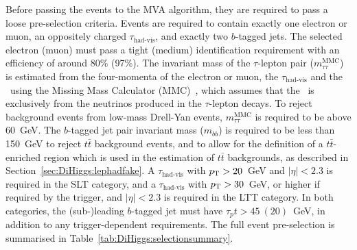 Before passing the events to the MVA algorithm, they are required to pass a loose
pre-selection criteria. 
Events are required to contain exactly 
one electron or muon, 
an oppositely charged $\tau_\text{had-vis}$, 
and exactly two $b$-tagged jets.
The selected electron (muon) must pass a 
tight (medium) identification requirement with an efficiency of around 80\% (97\%).
The invariant mass of the $\tau$-lepton pair ($m_{\tau\tau}^\text{MMC}$) 
is estimated from the four-momenta of the electron or muon, 
the $\tau_\text{had-vis}$ and the \met\ 
using the Missing Mass Calculator (MMC)~\cite{Elagin:2010aw}, 
which assumes that the \met\ is exclusively from the neutrinos 
produced in the $\tau$-lepton decays. 
To reject background events from low-mass Drell-Yan events, $m_{\tau\tau}^\text{MMC}$ is required to be above 60~GeV.
The $b$-tagged jet pair invariant mass ($m_{bb}$) is required to be less than 150~GeV 
to reject $t\bar t$ background events, and to allow for the definition of 
a $t\bar t$-enriched region which is used in the estimation of $t\bar t$ backgrounds, 
as described in Section~\ref{sec:DiHiggs:lephadfake}. 
A $\tau_\text{had-vis}$ with $p_{\mathrm T}>20$~GeV and 
$\vert\eta\vert<2.3$ is required in the SLT category, 
and a $\tau_\text{had-vis}$ with $p_{\mathrm T}>30$~GeV, 
or higher if required by the trigger, 
and $\vert\eta\vert<2.3$ is required in the LTT category. 
In both categories, the (sub-)leading $b$-tagged jet 
must have $\tau_pt>45~(20)$~GeV, 
in addition to any trigger-dependent requirements.
The full event pre-selection is summarised in Table~\ref{tab:DiHiggs:selectionsummary}. 

